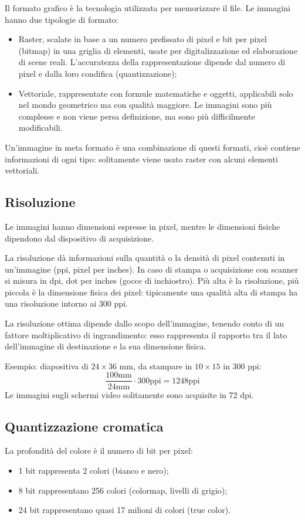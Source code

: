Il formato grafico è la tecnologia utilizzata per memorizzare il file. Le immagini hanno due tipologie di formato: 
\begin{itemize}
	\item Raster, scalate in base a un numero prefissato di pixel e bit per pixel (bitmap) in una griglia di elementi, usate per digitalizzazione ed elaborazione di scene reali. L'accuratezza della rappresentazione dipende dal numero di pixel e dalla loro condifica (quantizzazione);
	\item Vettoriale, rappresentate con formule matematiche e oggetti, applicabili solo nel mondo geometrico ma con qualità maggiore. Le immagini sono più complesse e non viene persa definizione, ma sono più difficilmente modificabili.
\end{itemize}
Un'immagine in meta formato è una combinazione di questi formati, cioè contiene informazioni di ogni tipo: solitamente viene usato raster con alcuni elementi vettoriali.

\subsection{Risoluzione}
Le immagini hanno dimensioni espresse in pixel, mentre le dimensioni fisiche dipendono dal dispositivo di acquisizione. 

La risoluzione dà informazioni sulla quantità o la densità di pixel contenuti in un'immagine (ppi, pixel per inches). In caso di stampa o acquisizione con scanner si misura in dpi, dot per inches (gocce di inchiostro). Più alta è la risoluzione, più piccola è la dimensione fisica dei pixel: tipicamente una qualità alta di stampa ha una risoluzione intorno ai 300 ppi.

La risoluzione ottima dipende dallo scopo dell'immagine, tenendo conto di un fattore moltiplicativo di ingrandimento: esso rappresenta il rapporto tra il lato dell'immagine di destinazione e la sua dimensione fisica.

Esempio: diapositiva di $24\times36$ mm, da stampare in $10\times15$ in 300 ppi:
$$\frac{100\text{mm}}{24\text{mm}} \cdot 300\text{ppi} = 1248 \text{ppi}$$
Le immagini sugli schermi video solitamente sono acquisite in 72 dpi.

\subsection{Quantizzazione cromatica}
La profondità del colore è il numero di bit per pixel:
\begin{itemize}
	\item 1 bit rappresenta 2 colori (bianco e nero);
	\item 8 bit rappresentano 256 colori (colormap, livelli di grigio);
	\item 24 bit rappresentano quasi 17 milioni di colori (true color).
\end{itemize}

